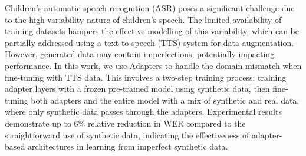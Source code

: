 \label{chap:TTS}
\cleardoublepage
Children's automatic speech recognition (ASR) poses a significant challenge due to the high variability nature of children's speech. The limited availability of training datasets hampers the effective modelling of this variability, which can be partially addressed using a text-to-speech (TTS) system for data augmentation. However, generated data may contain imperfections, potentially impacting performance. In this work, we use Adapters to handle the domain mismatch when fine-tuning with TTS data. This involves a two-step training process: training adapter layers with a frozen pre-trained model using synthetic data, then fine-tuning both adapters and the entire model with a mix of synthetic and real data, where only synthetic data passes through the adapters. Experimental results demonstrate up to 6\% relative reduction in WER compared to the straightforward use of synthetic data, indicating the effectiveness of adapter-based architectures in learning from imperfect synthetic data.

